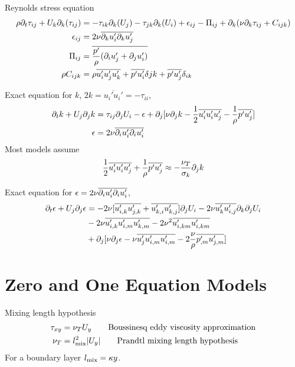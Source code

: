 \documentclass{article}
\begin{document}
Reynolds stress equation
\begin{align*}
   \rho \partial_t \tau_{ij} + U_k \partial_k(\tau_{ij}) &=
      -\tau_{ik}\partial_k(U_j) -\tau_{jk}\partial_k(U_i) + \epsilon_{ij} -\Pi_{ij} 
      + \partial_k( \nu \partial_k \tau_{ij} + C_{ijk} ) \\
   \epsilon_{ij} &= 2\nu \overline{\partial_k u_i' \partial_k u_j'} \\
   \Pi_{ij} &= \overline{ {p'\over\rho}(  \partial_i u_j' + \partial_j u_i' ) }\\
   \rho C_{ijk} &= \rho \overline{ u_i' u_j' u_k'} + \overline{ p' u_i'} \delta{jk} + \overline{p' u_j'} \delta_{ik}
\end{align*}

Exact equation for $k$, $2k = \overline{u_i' u_i'} = -\tau_{ii}$,
\begin{align*}
  \partial_t k + U_j\partial_j k  &= \tau_{ij} \partial_j U_i - \epsilon
    + \partial_j[ \nu\partial_j k -{1\over2}\overline{u_i'u_i'u_j'} - {1\over\rho}\overline{p'u_j'} ] \\   
   \epsilon &= 2\nu \overline{\partial_i u_i' \partial_i u_i'} \\
\end{align*}
Most models assume
\[
 {1\over2}\overline{u_i'u_i'u_j'}+ {1\over\rho}\overline{p'u_j'} \approx -{\nu_T\over\sigma_k} \partial_j k
\]


Exact equation for $\epsilon= 2\nu \overline{\partial_i u_i' \partial_i u_i'}$,
\begin{align*}
  \partial_t \epsilon + U_j\partial_j \epsilon  &= 
        -2\nu[ \overline{ u_{i,k}' u_{j,k}'} + \overline{ u_{k,i}' u_{k,j}' }] \partial_j U_i
        -2\nu  \overline{ u_k' u_{i,j}' } \partial_k\partial_j U_i \\
     & -2\nu \overline{ u_{i,k}' u_{i,m}' u_{k,m}'} - 2\nu^2\overline{u_{i,km}' u_{i,km}'} \\
    & + \partial_j[ \nu\partial_j \epsilon -\nu\overline{ u_j' u_{i,m}' u_{i,m}'} 
                  - 2{\nu\over\rho} \overline{p_{,m}' u_{j,m}'} ]
\end{align*}


\section{Zero and One Equation Models}

Mixing length hypothesis
\begin{align*}
  \tau_{xy} &= \nu_T U_y    \qquad\mbox{Boussinesq eddy viscosity approximation} \\
  \nu_T &= l_{\rm mix}^2 | U_y | \qquad\mbox{Prandtl mixing length hypothesis}
\end{align*}
For a boundary layer $l_{\rm mix} = \kappa y$.
\end{document}
